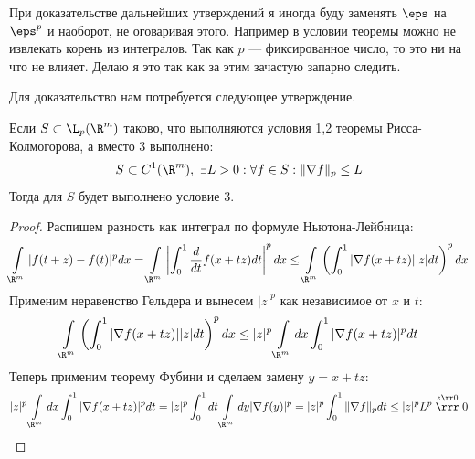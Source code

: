 \begin{remark}
	При доказательстве дальнейших утверждений я иногда буду заменять $\eps$ на $\eps^p$ и наоборот, не оговаривая этого. Например в условии теоремы можно не извлекать корень из интегралов. Так как $p$ --- фиксированное число, то это ни на что не влияет. Делаю я это так как за этим зачастую запарно следить.
\end{remark}
Для доказательство нам потребуется следующее утверждение.
\begin{claim}
	Если $S \subset \L_p(\R^m)$ таково, что выполняются условия 1,2 теоремы Рисса-Колмогорова, а вместо 3 выполнено:
	$$
	S \subset C^{1}(\R^m), \ \exists L > 0: \forall f \in S :  \|\nabla f \|_p \leq L
	$$
	Тогда для $S$ будет выполнено условие 3.
\end{claim}
\begin{proof}
	Распишем разность как интеграл по формуле Ньютона-Лейбница:
	$$
	\int\limits_{\R^m}|f(t + z) - f(t)|^pdx = \int\limits_{\R^m}\left|\int_{0}^1\frac{d}{dt} f(x + tz)dt \right|^pdx \leq \int\limits_{\R^m} \left(\int_{0}^1 |\nabla f(x + tz)||z|dt\right)^pdx
	$$
	Применим неравенство Гельдера и вынесем $|z|^p$ как независимое от $x$ и $t$:
	$$
	\int\limits_{\R^m} \left(\int_{0}^1 |\nabla f(x + tz)||z|dt\right)^pdx \leq  |z|^p\int\limits_{\R^m}dx \int_0^1|\nabla f(x+tz)|^pdt
	$$
	Теперь применим теорему Фубини и сделаем замену $y = x + tz$:
	$$
	|z|^p\int\limits_{\R^m}dx \int_0^1|\nabla f(x+tz)|^pdt  =  |z|^p \int_{0}^1dt \int\limits_{\R^m}dy |\nabla f(y)|^p = |z|^p\int_{0}^1 \|\nabla f\|_p dt  \leq |z|^pL^p \stackrel{z \rr 0}{\rrr} 0 
	$$
\end{proof}
